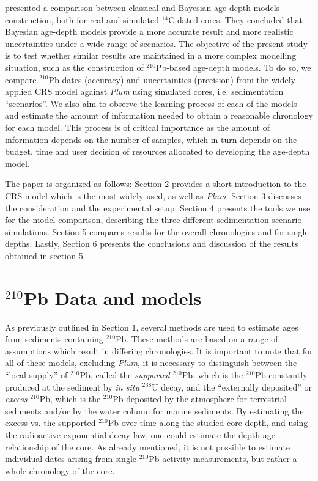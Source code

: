 \documentclass [10pt] {article}
\newcommand{\ca}{\color{black}} %
\begin{document}
	\citet{Blaauw2018} presented a comparison between classical and Bayesian age-depth models construction, both for real and simulated $^{14}$C-dated cores.
They concluded that Bayesian age-depth models provide a more accurate result and more realistic uncertainties under a wide range of scenarios.  
The objective of the present study is to test whether similar results are maintained in a more complex modelling situation, such as the construction of $^{210}$Pb-based age-depth models.
To do so, we compare $^{210}$Pb dates (accuracy) and uncertainties (precision) from the widely applied CRS model against \textit{Plum} using simulated cores, i.e. sedimentation ``scenarios''.
We also aim to observe the learning process of each of the models and estimate the amount of information needed to obtain a reasonable chronology for each model.
This process is of critical importance as the amount of information depends on the number of samples, which in turn depends on the budget, time and user decision of resources allocated to developing the age-depth model. 


	The paper is organized as follows: 
Section 2 provides a short introduction to the CRS model which is the most widely used, as well as \textit{Plum}.
Section 3 discusses the consideration and the experimental setup.
Section 4 presents the tools we use for the model comparison, describing the three different sedimentation scenario simulations.
Section 5 compares results for the overall chronologies and for single depths.
Lastly, Section 6 presents the conclusions and discussion of the results obtained in section 5. 

\section{$^{210}$Pb Data and models}

As previously outlined in Section 1, several methods are used to estimate ages from sediments containing $^{210}$Pb. 
These methods are based on a range of assumptions which result in differing chronologies. 
It is important to note that for all of these models, excluding \textit{Plum}, it is necessary to distinguish between the ``local supply'' of $^{210}$Pb, called the \textit{supported} $^{210}$Pb, which is the $^{210}$Pb constantly produced at the sediment by \textit{in situ} $^{238}$U decay, and the ``externally deposited'' or \textit{excess} $^{210}$Pb, which is the $^{210}$Pb deposited by the atmosphere for terrestrial sediments and/or by the water column for marine sediments. By estimating the excess vs. the supported $^{210}$Pb over time along the studied core depth, and using the radioactive exponential decay law, one could estimate the depth-age relationship of the core. As already mentioned, it is not possible to estimate individual dates arising from single  $^{210}$Pb activity measurements, but rather a whole chronology of the core. %
\end{document}
